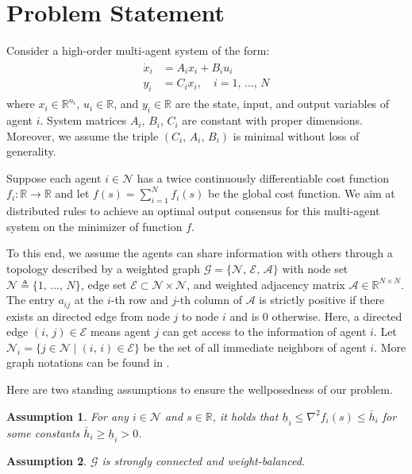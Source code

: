 \documentclass[sort&compress]{IEEEtran}
\newcommand{\R}{\mathbb{R}}
\newcommand{\N}{\mathcal{N}}
\newcommand{\A}{\mathcal{A}}
\newtheorem{ass}{Assumption}
\begin{document}
\section{Problem Statement}\label{sec:form}

Consider a high-order multi-agent system of the form:
\begin{align}\label{sys:agent}
    \begin{split}
        \dot{x}_i&=A_ix_i+B_iu_i\\
        y_i&=C_ix_i,  \quad i=1,\,\dots,\,N
    \end{split}
\end{align}
where $x_i\in \R^{n_i}$, $u_i\in \R$, and $y_i\in \R$ are the state, input, and output variables of agent $i$. System matrices $A_i,\, B_i,\, C_i$ are constant with proper dimensions. Moreover, we assume the triple $(C_i,\, A_i,\, B_i)$ is minimal without loss of generality. 

Suppose each agent $i\in \mathcal{N}$ has a twice continuously differentiable cost function $f_i \colon \mathbb{R} \to \mathbb{R}$ and let $f(s)=\sum\nolimits_{i=1}^Nf_i(s)$ be the global cost function. We aim at distributed rules to achieve an optimal output consensus for this multi-agent system on the minimizer of function $f$.%

To this end, we assume the agents can share information with others through a topology described by a weighted graph $\mathcal{G}= \{\mathcal{N},\, \mathcal{E},\,\mathcal{A}\}$ with node set $\mathcal{N} \triangleq \{1,\,\dots,\, N\}$, edge set $\mathcal{E}\subset \N\times \N$, and weighted adjacency matrix $\A\in \R^{N\times N}$. The entry $a_{ij}$ at the $i$-th row and $j$-th column of $\mathcal{A}$ is strictly positive if there exists an directed edge from node $j$ to node $i$ and is $0$ otherwise. Here, a directed edge $(i,\,j)\in \mathcal{E}$ means agent $j$ can get access to the information of agent $i$. Let $\mathcal{N}_i=\{j\in \N\mid (i,\,i)\in \mathcal{E}\}$ be the set of all immediate neighbors of agent $i$.  More graph notations can be found in \cite{mesbahi2010graph}.  
 
Here are two standing assumptions to ensure the wellposedness of our problem.
\begin{ass}\label{ass:func}
	For any $i\in \N$ and $s\in \R$, it holds that $\underline{h}_i  \leq \nabla^2 f_i(s) \leq \bar h_i$ for some constants $\bar h_i\geq \underline{h}_i>0$.
\end{ass}
\begin{ass}\label{ass:graph}
	 $\mathcal{G}$ is strongly connected and weight-balanced.
\end{ass}
\end{document}
